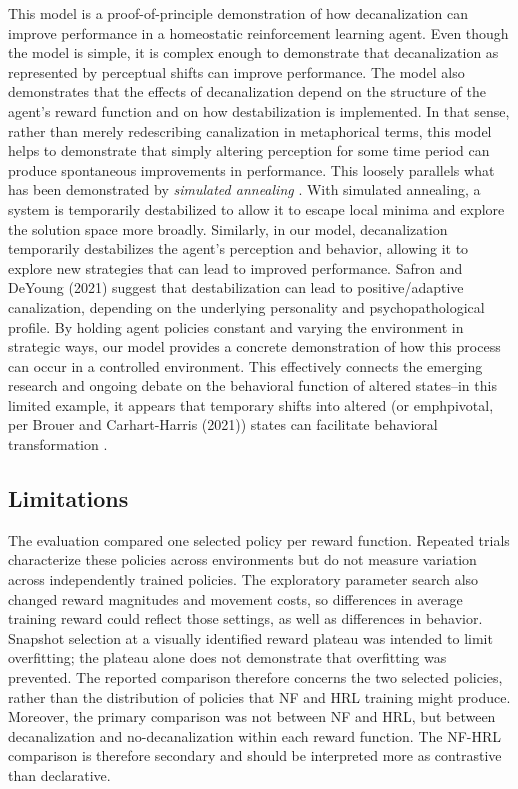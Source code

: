 \documentclass[12pt,fleqn]{article}
\begin{document}
This model is a proof-of-principle demonstration of how decanalization can improve performance in a homeostatic reinforcement learning agent. Even though the model is simple, it is complex enough to demonstrate that decanalization as represented by perceptual shifts can improve performance. The model also demonstrates that the effects of decanalization depend on the structure of the agent's reward function and on how destabilization is implemented. In that sense, rather than merely redescribing canalization in metaphorical terms, this model helps to demonstrate that simply altering perception for some time period can produce spontaneous improvements in performance. This loosely parallels what has been demonstrated by \emph{simulated annealing} \cite{kirkpatrick_optimization_1983, hajek_cooling_1988}. With simulated annealing, a system is temporarily destabilized to allow it to escape local minima and explore the solution space more broadly. Similarly, in our model, decanalization temporarily destabilizes the agent's perception and behavior, allowing it to explore new strategies that can lead to improved performance. Safron and DeYoung (2021) suggest that destabilization can lead to positive/adaptive canalization, depending on the underlying personality and psychopathological profile. By holding agent policies constant and varying the environment in strategic ways, our model provides a concrete demonstration of how this process can occur in a controlled environment. This effectively connects the emerging research and ongoing debate on the behavioral function of altered states--in this limited example, it appears that temporary shifts into altered (or emph{pivotal}, per Brouer and Carhart-Harris (2021)) states can facilitate behavioral transformation \cite{clingoDisintegrationReintegrationModelPsychological2025}.

\subsection{Limitations}

The evaluation compared one selected policy per reward function. Repeated trials characterize these policies across environments but do not measure variation across independently trained policies. The exploratory parameter search also changed reward magnitudes and movement costs, so differences in average training reward could reflect those settings, as well as differences in behavior. Snapshot selection at a visually identified reward plateau was intended to limit overfitting; the plateau alone does not demonstrate that overfitting was prevented. The reported comparison therefore concerns the two selected policies, rather than the distribution of policies that NF and HRL training might produce. Moreover, the primary comparison was not between NF and HRL, but between decanalization and no-decanalization within each reward function. The NF-HRL comparison is therefore secondary and should be interpreted more as contrastive than declarative.
\end{document}
